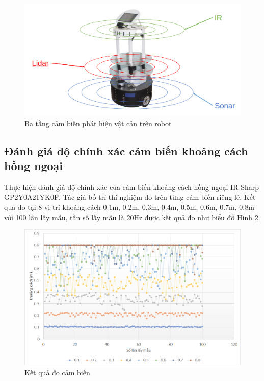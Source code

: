 \begin{figure}[htbp]
    \centering
    \includegraphics[width=0.75\linewidth]{figures/rb_Multi_Sensor_layer.png}
    \caption{Ba tầng cảm biến phát hiện vật cản trên robot}
    \label{fig:RB-multi-sensor-layer}
\end{figure}

\subsection{Đánh giá độ chính xác cảm biến khoảng cách hồng ngoại}
\label{sub:DanhgiaCBIR}

Thực hiện đánh giá độ chính xác của cảm biến khoảng cách hồng ngoại IR Sharp GP2Y0A21YK0F. Tác giả bố trí thí nghiệm đo trên từng cảm biến riêng lẻ. Kết quả đo tại 8 vị trí khoảng cách 0.1m, 0.2m, 0.3m, 0.4m, 0.5m, 0.6m, 0.7m, 0.8m với 100 lần lấy mẫu, tần số lấy mẫu là 20Hz được kết quả đo như biểu đồ Hình \ref{fig:Ir-eval-100}.

\begin{figure}[htbp]
    \centering
    \includegraphics[width=\linewidth]{figures/IR-eval-chart.png}
    \caption{Kết quả đo cảm biến}
    \label{fig:Ir-eval-100}
\end{figure}


